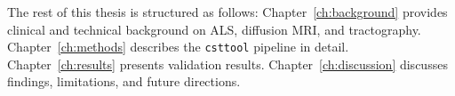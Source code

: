 The rest of this thesis is structured as follows: Chapter~\ref{ch:background} provides clinical and technical background on ALS, diffusion MRI, and tractography. Chapter~\ref{ch:methods} describes the \texttt{csttool} pipeline in detail. Chapter~\ref{ch:results} presents validation results. Chapter~\ref{ch:discussion} discusses findings, limitations, and future directions.

